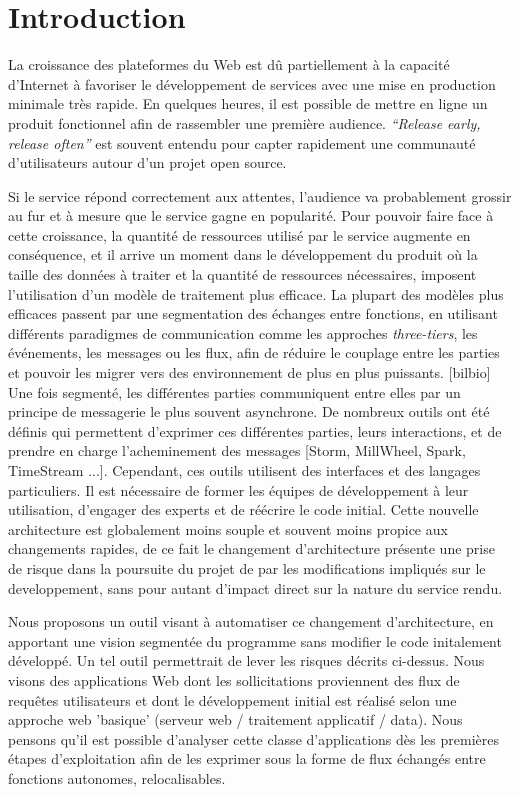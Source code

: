 \section{Introduction}

La croissance des plateformes du Web est dû partiellement à la capacité d'Internet à favoriser le développement de services avec une mise en production minimale très rapide.
En quelques heures, il est possible de mettre en ligne un produit fonctionnel afin de rassembler une première audience.
\textit{``Release early, release often''} est souvent entendu pour capter rapidement une communauté d'utilisateurs autour d'un projet open source.

Si le service répond correctement aux attentes, l'audience va probablement grossir au fur et à mesure que le service gagne en popularité.
Pour pouvoir faire face à cette croissance, la quantité de ressources utilisé par le service augmente en conséquence, et il arrive un moment dans le développement du produit où la taille des données à traiter et la quantité de ressources nécessaires, imposent l'utilisation d'un modèle de traitement plus efficace.
La plupart des modèles plus efficaces passent par une segmentation des échanges entre fonctions, en utilisant différents paradigmes de communication comme les approches \textit{three-tiers}, les événements, les messages ou les flux, afin de réduire le couplage entre les parties et pouvoir les migrer vers des environnement de plus en plus puissants. [bilbio]
Une fois segmenté, les différentes parties communiquent entre elles par un principe de messagerie le plus souvent asynchrone.
De nombreux outils ont été définis qui permettent d'exprimer ces différentes parties, leurs interactions, et de prendre en charge l'acheminement des messages [Storm, MillWheel, Spark, TimeStream ...].
Cependant, ces outils utilisent des interfaces et des langages particuliers.
Il est nécessaire de former les équipes de développement à leur utilisation, d'engager des experts et de réécrire le code initial.
Cette nouvelle architecture est globalement moins souple et souvent moins propice aux changements rapides, de ce fait le changement d'architecture présente une prise de risque dans la poursuite du projet de par les modifications impliqués sur le developpement, sans pour autant d'impact direct sur la nature du service rendu.

Nous proposons un outil visant à automatiser ce changement d'architecture, en apportant une vision segmentée du programme sans modifier le code initalement développé.
Un tel outil permettrait de lever les risques décrits ci-dessus.
Nous visons des applications Web dont les sollicitations proviennent des flux de requêtes utilisateurs et dont le développement initial est réalisé selon une approche web 'basique' (serveur web / traitement applicatif / data).
Nous pensons qu'il est possible d'analyser cette classe d'applications dès les premières étapes d'exploitation afin de les exprimer sous la forme de flux échangés entre fonctions autonomes, relocalisables.

